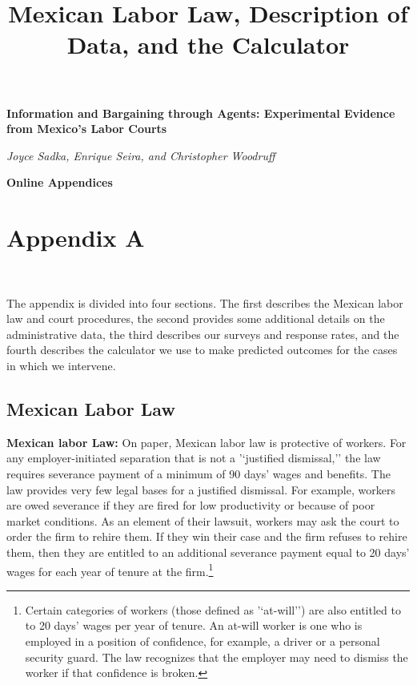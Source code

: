 \begin{center}
\large{\textbf{Information and Bargaining through Agents: Experimental Evidence from Mexico's Labor Courts}}


\textit{Joyce Sadka,  Enrique Seira, and Christopher Woodruff}

\Large{\textbf{Online Appendices}}
\end{center}

\section*{Appendix A}
\label{appendix_a}
\title{\Large{\textbf{Mexican Labor Law, Description of Data, and the Calculator}}}
\\

\setcounter{table}{0}
\renewcommand{\thetable}{A.\arabic{table}} 
\setcounter{figure}{0}
\renewcommand{\thefigure}{A.\arabic{figure}} 

The appendix is divided into four sections. The first describes the Mexican labor law and court procedures, the second provides some additional details on the administrative data, the third describes our surveys and response rates, and the fourth describes the calculator we use to make predicted outcomes for the cases in which we intervene. 

\subsection{Mexican Labor Law}

\textbf{Mexican labor Law:} On paper, Mexican labor law is protective of workers. For any employer-initiated separation that is not a '`justified dismissal,'' the law requires severance payment of a minimum of 90 days' wages and benefits. The law provides very few legal bases for a justified dismissal. For example, workers are owed severance if they are fired for low productivity or because of poor market conditions.  As an element of their lawsuit, workers may ask the court to order the firm to rehire them. If they win their case and the firm refuses to rehire them, then they are entitled to an additional severance payment equal to 20 days' wages for each year of tenure at the firm.\footnote{Certain categories of workers (those defined as '`at-will'') are also entitled to to 20 days' wages per year of tenure. An at-will worker is one who is employed in a position of confidence, for example, a driver or a personal security guard. The law recognizes that the employer may need to dismiss the worker if that confidence is broken.} 

